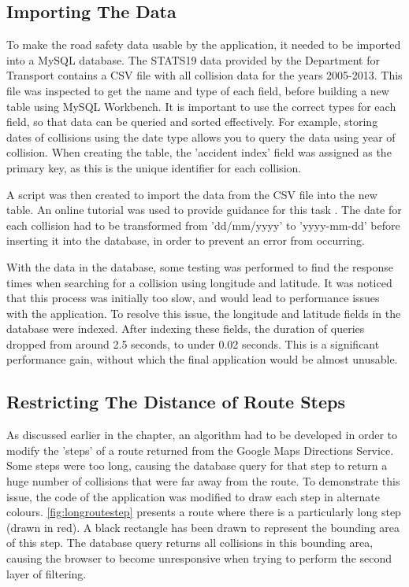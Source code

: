 \documentclass[authoryearcitations]{UoYCSproject}
\begin{document}
\subsection{Importing The Data}

To make the road safety data usable by the application, it needed to be imported into a MySQL database. The STATS19 data provided by the Department for Transport contains a CSV file with all collision data for the years 2005-2013. This file was inspected to get the name and type of each field, before building a new table using MySQL Workbench. It is important to use the correct types for each field, so that data can be queried and sorted effectively. For example, storing dates of collisions using the date type allows you to query the data using year of collision. When creating the table, the 'accident index' field was assigned as the primary key, as this is the unique identifier for each collision.

A script was then created to import the data from the CSV file into the new table. An online tutorial was used to provide guidance for this task \citep{MySQLTutorial}. The date for each collision had to be transformed from 'dd/mm/yyyy' to 'yyyy-mm-dd' before inserting it into the database, in order to prevent an error from occurring.

With the data in the database, some testing was performed to find the response times when searching for a collision using longitude and latitude. It was noticed that this process was initially too slow, and would lead to performance issues with the application. To resolve this issue, the longitude and latitude fields in the database were indexed. After indexing these fields, the duration of queries dropped from around 2.5 seconds, to under 0.02 seconds. This is a significant performance gain, without which the final application would be almost unusable.

\subsection{Restricting The Distance of Route Steps}
\label{sec:restrictAlgorithm}

As discussed earlier in the chapter, an algorithm had to be developed in order to modify the 'steps' of a route returned from the Google Maps Directions Service. Some steps were too long, causing the database query for that step to return a huge number of collisions that were far away from the route. To demonstrate this issue, the code of the application was modified to draw each step in alternate colours. \autoref{fig:longroutestep} presents a route where there is a particularly long step (drawn in red). A black rectangle has been drawn to represent the bounding area of this step. The database query returns all collisions in this bounding area, causing the browser to become unresponsive when trying to perform the second layer of filtering. 
\end{document}
